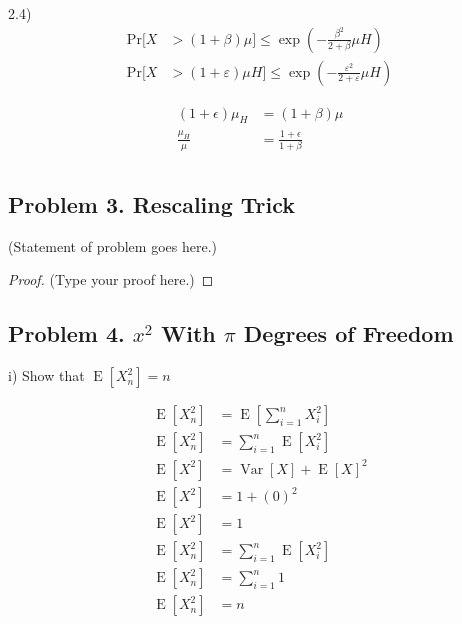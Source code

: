 \documentclass[12pt]{article}
\begin{document}
	2.4)
	\begin{align*}
		\mathrm{Pr}[X &> (1+\beta)\mu]\leq\exp\left(-\frac{\beta^{2}}{2+\beta}\mu H\right) \\
		\mathrm{Pr}[X &> (1+\varepsilon)\mu H]\leq\exp\left(-\frac{\varepsilon^{2}}{2+\varepsilon}\mu H\right)
	\end{align*}

	\begin{align*}
		(1 + \epsilon) \mu_{H} &= (1 + \beta) \mu \\
		\frac{\mu_{H}}{\mu} &= \frac{1 + \epsilon}{1 + \beta}\\
	\end{align*}
	\vspace{2in} %
	
	
	\subsection*{Problem 3. Rescaling Trick}
	(Statement of problem goes here.)\\
	
	\begin{proof}
		(Type your proof here.)
	\end{proof}
	
	\vspace{2in} %
	
	
	
	\subsection*{Problem 4. $x^2$ With $\pi$ Degrees of Freedom}

	i) Show that
	$\operatorname{E}\left[X_{n}^{2}\right]=n$

	\begin{align*}
		\operatorname{E}\left[X_{n}^{2}\right]&=\operatorname{E}\left[ \sum_{i=1}^{n} X_i^2 \right] \\
		\operatorname{E}\left[X_{n}^{2}\right]&=\sum_{i=1}^{n}\operatorname{E}\left[  X_i^2 \right] \\
		\operatorname{E}\left[X^2\right]&=\operatorname{Var}\left[ X\right] +  \operatorname{E}\left[X\right]^2\\
		\operatorname{E}\left[X^2\right]&= 1 + (0)^2\\
		\operatorname{E}\left[X^2\right]&= 1 \\
		\operatorname{E}\left[X_{n}^{2}\right]&=\sum_{i=1}^{n}\operatorname{E}\left[  X_i^2 \right] \\
		\operatorname{E}\left[X_{n}^{2}\right]&=\sum_{i=1}^{n}1 \\
		\operatorname{E}\left[X_{n}^{2}\right]&= n \\
	\end{align*}
	
\end{document}
